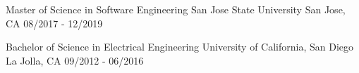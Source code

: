 

\begin{cventries}

  \cventryeducation
    {Master of Science in Software Engineering} %
    {San Jose State University} %
    {San Jose, CA} %
    {08/2017 - 12/2019} %

  \cventryeducation
    {Bachelor of Science in Electrical Engineering} %
    {University of California, San Diego} %
    {La Jolla, CA} %
    {09/2012 - 06/2016} %

   

\end{cventries}
